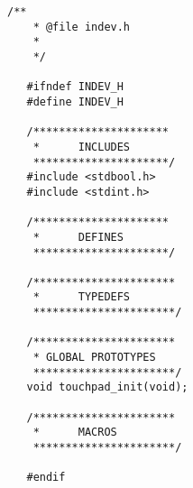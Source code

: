 \begin{lstlisting}[captionpos=t, caption={Fichero \texttt{Touchpad.h} con las estructuras de mensajes}]
    /**
    * @file indev.h
    *
    */
   
   #ifndef INDEV_H
   #define INDEV_H
   
   /*********************
    *      INCLUDES
    *********************/
   #include <stdbool.h>
   #include <stdint.h>
   
   /*********************
    *      DEFINES
    *********************/
   
   /**********************
    *      TYPEDEFS
    **********************/
   
   /**********************
    * GLOBAL PROTOTYPES
    **********************/
   void touchpad_init(void);
   
   /**********************
    *      MACROS
    **********************/
   
   #endif   
\end{lstlisting}

